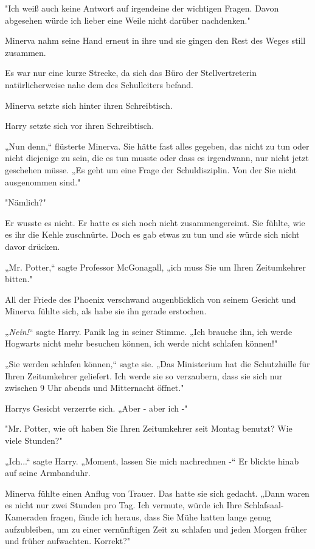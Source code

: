 {"Ich weiß auch keine Antwort auf irgendeine der wichtigen Fragen. Davon abgesehen würde ich lieber eine Weile nicht darüber nachdenken."

Minerva nahm seine Hand erneut in ihre und sie gingen den Rest des Weges still zusammen.

Es war nur eine kurze Strecke, da sich das Büro der Stellvertreterin natürlicherweise nahe dem des Schulleiters befand.

Minerva setzte sich hinter ihren Schreibtisch.

Harry setzte sich vor ihren Schreibtisch.

„Nun denn,“ flüsterte Minerva. Sie hätte fast alles gegeben, das nicht zu tun oder nicht diejenige zu sein, die es tun musste oder dass es irgendwann, nur nicht jetzt geschehen müsse. „Es geht um eine Frage der Schuldisziplin. Von der Sie nicht ausgenommen sind."

"Nämlich?"

Er wusste es nicht. Er hatte es sich noch nicht zusammengereimt. Sie fühlte, wie es ihr die Kehle zuschnürte. Doch es gab etwas zu tun und sie würde sich nicht davor drücken.

„Mr. Potter,“ sagte Professor McGonagall, „ich muss Sie um Ihren Zeitumkehrer bitten."

All der Friede des Phoenix verschwand augenblicklich von seinem Gesicht und Minerva fühlte sich, als habe sie ihn gerade erstochen.

„\emph{Nein!}“ sagte Harry. Panik lag in seiner Stimme. „Ich brauche ihn, ich werde Hogwarts nicht mehr besuchen können, ich werde nicht schlafen können!"

„Sie werden schlafen können,“ sagte sie. „Das Ministerium hat die Schutzhülle für Ihren Zeitumkehrer geliefert. Ich werde sie so verzaubern, dass sie sich nur zwischen 9 Uhr abends und Mitternacht öffnet."

Harrys Gesicht verzerrte sich. „Aber - aber ich -"

"Mr. Potter, wie oft haben Sie Ihren Zeitumkehrer seit Montag benutzt? Wie viele Stunden?"

„Ich...“ sagte Harry. „Moment, lassen Sie mich nachrechnen -“ Er blickte hinab auf seine Armbanduhr.

Minerva fühlte einen Anflug von Trauer. Das hatte sie sich gedacht. „Dann waren es nicht nur zwei Stunden pro Tag. Ich vermute, würde ich Ihre Schlafsaal-Kameraden fragen, fände ich heraus, dass Sie Mühe hatten lange genug aufzubleiben, um zu einer vernünftigen Zeit zu schlafen und jeden Morgen früher und früher aufwachten. Korrekt?"

}
